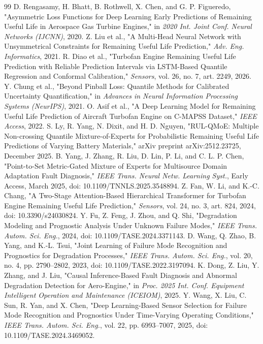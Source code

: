 \documentclass[review,12pt]{elsarticle}
\begin{document}
\begin{thebibliography}{99}
  D. Rengasamy, H. Bhatt, B. Rothwell, X. Chen, and G. P. Figueredo, "Asymmetric Loss Functions for Deep Learning Early Predictions of Remaining Useful Life in Aerospace Gas Turbine Engines," in \textit{2020 Int. Joint Conf. Neural Networks (IJCNN)}, 2020.
  Z. Liu et al., "A Multi-Head Neural Network with Unsymmetrical Constraints for Remaining Useful Life Prediction," \textit{Adv. Eng. Informatics}, 2021.
  R. Diao et al., "Turbofan Engine Remaining Useful Life Prediction with Reliable Prediction Intervals via LSTM-Based Quantile Regression and Conformal Calibration," \textit{Sensors}, vol. 26, no. 7, art. 2249, 2026.
  Y. Chung et al., "Beyond Pinball Loss: Quantile Methods for Calibrated Uncertainty Quantification," in \textit{Advances in Neural Information Processing Systems (NeurIPS)}, 2021.
  O. Asif et al., "A Deep Learning Model for Remaining Useful Life Prediction of Aircraft Turbofan Engine on C-MAPSS Dataset," \textit{IEEE Access}, 2022.
  S. Ly, R. Yang, N. Dixit, and H. D. Nguyen, "RUL-QMoE: Multiple Non-crossing Quantile Mixture-of-Experts for Probabilistic Remaining Useful Life Predictions of Varying Battery Materials," arXiv preprint arXiv:2512.23725, December 2025.
  B. Yang, J. Zhang, R. Liu, D. Lin, P. Li, and C. L. P. Chen, "Point-to-Set Metric-Gated Mixture of Experts for Multisource Domain Adaptation Fault Diagnosis," \textit{IEEE Trans. Neural Netw. Learning Syst.}, Early Access, March 2025, doi: 10.1109/TNNLS.2025.3548894.
  Z. Fan, W. Li, and K.-C. Chang, "A Two-Stage Attention-Based Hierarchical Transformer for Turbofan Engine Remaining Useful Life Prediction," \textit{Sensors}, vol. 24, no. 3, art. 824, 2024, doi: 10.3390/s24030824.
  Y. Fu, Z. Feng, J. Zhou, and Q. Shi, "Degradation Modeling and Prognostic Analysis Under Unknown Failure Modes," \textit{IEEE Trans. Autom. Sci. Eng.}, 2024, doi: 10.1109/TASE.2024.3371143.
  D. Wang, Q. Zhao, B. Yang, and K.-L. Tsui, "Joint Learning of Failure Mode Recognition and Prognostics for Degradation Processes," \textit{IEEE Trans. Autom. Sci. Eng.}, vol. 20, no. 4, pp. 2790--2802, 2023, doi: 10.1109/TASE.2022.3197094.
  K. Dong, Z. Liu, Y. Zhang, and J. Liu, "Causal Inference-Based Fault Diagnosis and Abnormal Degradation Detection for Aero-Engine," in \textit{Proc. 2025 Int. Conf. Equipment Intelligent Operation and Maintenance (ICEIOM)}, 2025.
  Y. Wang, X. Liu, C. Sun, R. Yan, and X. Chen, "Deep Learning-Based Sensor Selection for Failure Mode Recognition and Prognostics Under Time-Varying Operating Conditions," \textit{IEEE Trans. Autom. Sci. Eng.}, vol. 22, pp. 6993--7007, 2025, doi: 10.1109/TASE.2024.3469052.
\end{thebibliography}
\end{document}
